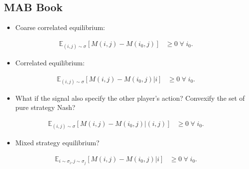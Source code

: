 \documentclass{article}
\begin{document}
\subsection{MAB Book}
\begin{itemize}
\item Coarse correlated equilibrium:
\end{itemize}\begin{align*}
\mathbb{E}_{\left(i, j\right)\sim \sigma}\left[M\left(i, j\right) - M\left(i_{0}, j\right)\right] &\geq  0 \;\forall\; i_{0} .
\end{align*}
\begin{itemize}
\item Correlated equilibrium:
\end{itemize}\begin{align*}
\mathbb{E}_{\left(i, j\right)\sim \sigma}\left[M\left(i, j\right) - M\left(i_{0}, j\right) | i\right] &\geq  0 \;\forall\; i_{0} .
\end{align*}
\begin{itemize}
\item What if the signal also specify the other player's action? Convexify the set of pure strategy Nash?
\end{itemize}\begin{align*}
\mathbb{E}_{\left(i, j\right)\sim \sigma}\left[M\left(i, j\right) - M\left(i_{0}, j\right) | \left(i, j\right)\right] &\geq  0 \;\forall\; i_{0} .
\end{align*}
\begin{itemize}
\item Mixed strategy equilibrium?
\end{itemize}\begin{align*}
\mathbb{E}_{i\sim \sigma_{i}, j\sim \sigma_{j}}\left[M\left(i, j\right) - M\left(i_{0}, j\right) | i\right] &\geq  0 \;\forall\; i_{0} .
\end{align*}
\end{document}
